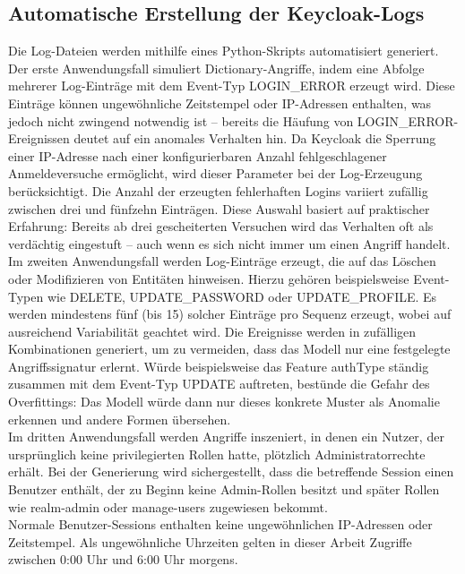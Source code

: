 \documentclass[a4paper,12pt]{article}
\begin{document}
	\subsection{Automatische Erstellung der Keycloak-Logs}
	Die Log-Dateien werden mithilfe eines Python-Skripts automatisiert generiert.
	\\[0.5em]
	Der erste Anwendungsfall simuliert Dictionary-Angriffe, indem eine Abfolge mehrerer Log-Einträge mit dem Event-Typ LOGIN\_ERROR erzeugt wird. Diese Einträge können ungewöhnliche Zeitstempel oder IP-Adressen enthalten, was jedoch nicht zwingend notwendig ist – bereits die Häufung von LOGIN\_ERROR-Ereignissen deutet auf ein anomales Verhalten hin. Da Keycloak die Sperrung einer IP-Adresse nach einer konfigurierbaren Anzahl fehlgeschlagener Anmeldeversuche ermöglicht, wird dieser Parameter bei der Log-Erzeugung berücksichtigt. Die Anzahl der erzeugten fehlerhaften Logins variiert zufällig zwischen drei und fünfzehn Einträgen. Diese Auswahl basiert auf praktischer Erfahrung: Bereits ab drei gescheiterten Versuchen wird das Verhalten oft als verdächtig eingestuft – auch wenn es sich nicht immer um einen Angriff handelt.
	\\[0.5em]
	Im zweiten Anwendungsfall werden Log-Einträge erzeugt, die auf das Löschen oder Modifizieren von Entitäten hinweisen. Hierzu gehören beispielsweise Event-Typen wie DELETE, UPDATE\_PASSWORD oder UPDATE\_PROFILE. Es werden mindestens fünf (bis 15) solcher Einträge pro Sequenz erzeugt, wobei auf ausreichend Variabilität geachtet wird. Die Ereignisse werden in zufälligen Kombinationen generiert, um zu vermeiden, dass das Modell nur eine festgelegte Angriffssignatur erlernt. Würde beispielsweise das Feature \gls{authType} ständig zusammen mit dem Event-Typ UPDATE auftreten, bestünde die Gefahr des Overfittings: Das Modell würde dann nur dieses konkrete Muster als Anomalie erkennen und andere Formen übersehen.
	\\[0.5em]
	Im dritten Anwendungsfall werden Angriffe inszeniert, in denen ein Nutzer, der ursprünglich keine privilegierten Rollen hatte, plötzlich Administratorrechte erhält. Bei der Generierung wird sichergestellt, dass die betreffende Session einen Benutzer enthält, der zu Beginn keine Admin-Rollen besitzt und später Rollen wie realm-admin oder manage-users zugewiesen bekommt.
	\\[0.5em]
	Normale Benutzer-Sessions enthalten keine ungewöhnlichen IP-Adressen oder Zeitstempel. Als ungewöhnliche Uhrzeiten gelten in dieser Arbeit Zugriffe zwischen 0:00 Uhr und 6:00 Uhr morgens.
\end{document}
